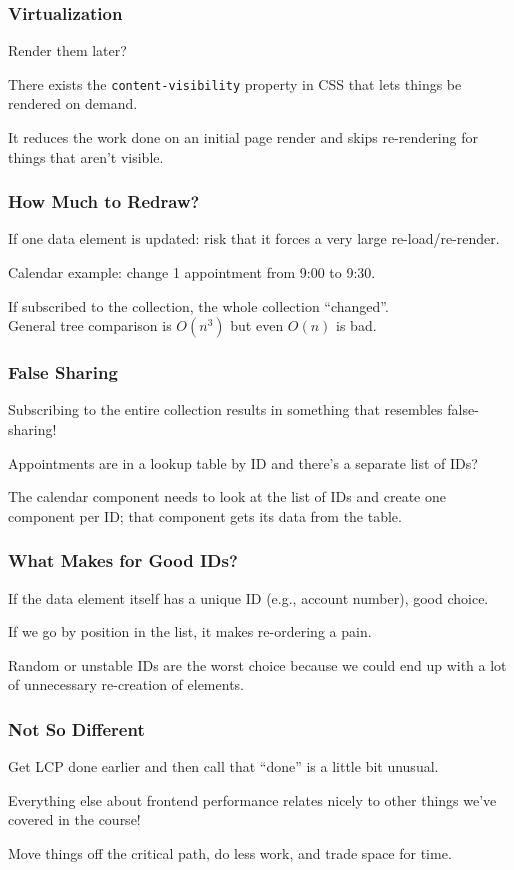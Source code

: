 \begin{frame}
\frametitle{Virtualization}

Render them later?

There exists the \texttt{content-visibility} property in CSS that lets things be rendered on demand.

It reduces the work done on an initial page render and skips re-rendering for things that aren't visible.

\end{frame}



\begin{frame}
\frametitle{How Much to Redraw?}

If one data element is updated: risk that it forces a very large re-load/re-render. 


Calendar example: change 1 appointment from 9:00 to 9:30. 

If subscribed to the collection, the whole collection ``changed''.\\
\quad General tree comparison is $O(n^{3})$ but even $O(n)$ is bad.


\end{frame}


\begin{frame}
\frametitle{False Sharing}
Subscribing to the entire collection results in something that resembles false-sharing!

Appointments are in a lookup table by ID and there's a separate list of IDs?

The calendar component needs to look at the list of IDs and create one component per ID; that component gets its data from the table.

\end{frame}



\begin{frame}
\frametitle{What Makes for Good IDs?}

If the data element itself has a unique ID (e.g., account number), good choice.

If we go by position in the list, it makes re-ordering a pain. 

Random or unstable IDs are the worst choice because we could end up with a lot of unnecessary re-creation of elements.

\end{frame}


\begin{frame}
\frametitle{Not So Different}

Get LCP done earlier and then call that ``done'' is a little bit unusual.

Everything else about frontend performance relates nicely to other things we've covered in the course!

Move things off the critical path, do less work, and trade space for time. 


\end{frame}




